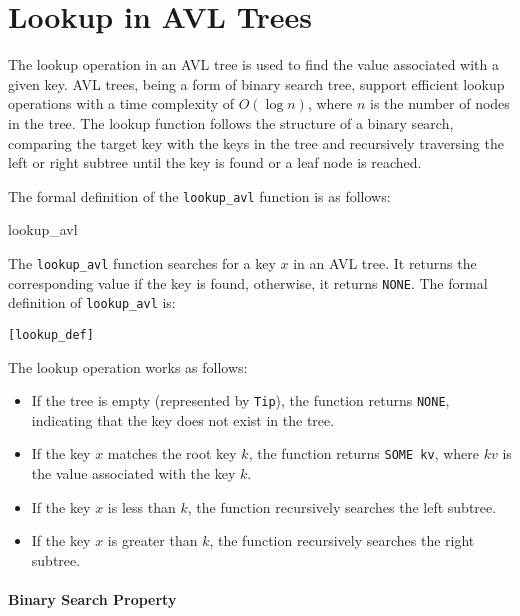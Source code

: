 \chapter{Lookup in AVL Trees}\label{chap:LaTeXAdvice}

The lookup operation in an AVL tree is used to find the value associated with a given key. AVL trees, being a form of binary search tree, support efficient lookup operations with a time complexity of \( O(\log n) \), where \( n \) is the number of nodes in the tree. The lookup function follows the structure of a binary search, comparing the target key with the keys in the tree and recursively traversing the left or right subtree until the key is found or a leaf node is reached.

The formal definition of the \texttt{lookup\_avl} function is as follows:

\begin{defn}{lookup\_avl}

The \texttt{lookup\_avl} function searches for a key \( x \) in an AVL tree. It returns the corresponding value if the key is found, otherwise, it returns \texttt{NONE}. The formal definition of \texttt{lookup\_avl} is:


\begin{alltt}
	[lookup_def]
\end{alltt}

\end{defn}


The lookup operation works as follows:
\begin{itemize}
    \item If the tree is empty (represented by \texttt{Tip}), the function returns \texttt{NONE}, indicating that the key does not exist in the tree.
    \item If the key \( x \) matches the root key \( k \), the function returns \texttt{SOME kv}, where \( kv \) is the value associated with the key \( k \).
    \item If the key \( x \) is less than \( k \), the function recursively searches the left subtree.
    \item If the key \( x \) is greater than \( k \), the function recursively searches the right subtree.
\end{itemize}

\subsubsection{Binary Search Property}

